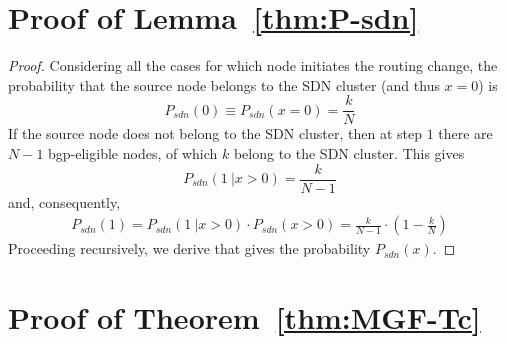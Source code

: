 
\section{Proof of Lemma~\ref{thm:P-sdn}}\label{sec:proof-of-thm-P-sdn}

\begin{proof}
Considering all the cases for which node initiates the routing change, the probability that the source node belongs to the SDN cluster (and thus $x=0$) is
\begin{equation}
P_{sdn}(0)\equiv P_{sdn}(x=0) = \frac{k}{N}
\end{equation}
If the source node does not belong to the SDN cluster, then at step $1$ there are $N-1$ bgp-eligible nodes, of which $k$ belong to the SDN cluster. This gives
\begin{equation}
P_{sdn}(1~|x>0) = \frac{k}{N-1}
\end{equation}
and, consequently,
\begin{align*}
P_{sdn}(1) = P_{sdn}(1~|x>0)\cdot P_{sdn}(x>0) = \textstyle \frac{k}{N-1}\cdot \left(1-\frac{k}{N}\right)
\end{align*}
Proceeding recursively, we derive  that gives the probability $P_{sdn}(x)$.
\end{proof}



\section{Proof of Theorem~\ref{thm:MGF-Tc}}\label{sec:proof-of-thm-MGF-Tc}

